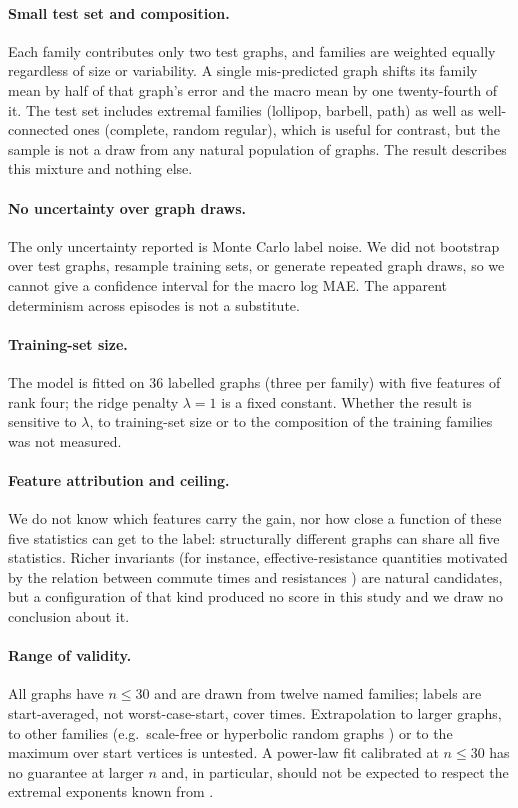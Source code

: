 \documentclass{article}
\begin{document}
\paragraph{Small test set and composition.} Each family contributes only two test graphs, and families are weighted equally regardless of size or variability. A single mis-predicted graph shifts its family mean by half of that graph's error and the macro mean by one twenty-fourth of it. The test set includes extremal families (lollipop, barbell, path) as well as well-connected ones (complete, random regular), which is useful for contrast, but the sample is not a draw from any natural population of graphs. The result describes this mixture and nothing else.

\paragraph{No uncertainty over graph draws.} The only uncertainty reported is Monte Carlo label noise. We did not bootstrap over test graphs, resample training sets, or generate repeated graph draws, so we cannot give a confidence interval for the macro log MAE. The apparent determinism across episodes is not a substitute.

\paragraph{Training-set size.} The model is fitted on $36$ labelled graphs (three per family) with five features of rank four; the ridge penalty $\lambda=1$ is a fixed constant. Whether the result is sensitive to $\lambda$, to training-set size or to the composition of the training families was not measured.

\paragraph{Feature attribution and ceiling.} We do not know which features carry the gain, nor how close a function of these five statistics can get to the label: structurally different graphs can share all five statistics. Richer invariants (for instance, effective-resistance quantities motivated by the relation between commute times and resistances \citep{Doyle1984RandomWA,Lovasz2001RandomWO}) are natural candidates, but a configuration of that kind produced no score in this study and we draw no conclusion about it.

\paragraph{Range of validity.} All graphs have $n\le 30$ and are drawn from twelve named families; labels are start-averaged, not worst-case-start, cover times. Extrapolation to larger graphs, to other families (e.g.\ scale-free or hyperbolic random graphs \citep{Kiwi2022CoverAH}) or to the maximum over start vertices is untested. A power-law fit calibrated at $n\le 30$ has no guarantee at larger $n$ and, in particular, should not be expected to respect the extremal exponents known from \citet{Feige1995ATU}.
\end{document}
